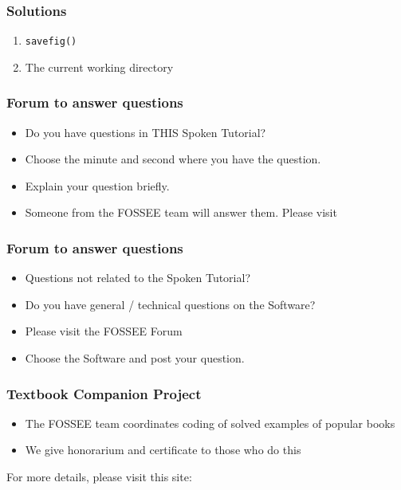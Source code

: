\documentclass[17pt]{beamer}
\begin{document}
\begin{frame}
\frametitle{Solutions}
\label{sec-11}
\begin{enumerate}
\item \texttt{savefig()}
\item The current working directory
\end{enumerate}
\end{frame}
\begin{frame}
\frametitle{Forum to answer questions}
\begin{itemize}
\item Do you have questions in THIS Spoken Tutorial?
\item Choose the minute and second where you have the question.
\item Explain your question briefly.
\item Someone from the FOSSEE team will answer them. Please visit 
\end{itemize}
\begin{center}
{\color{blue}{http://forums.spoken-tutorial.org/}}
 \end{center} 
\end{frame}
\begin{frame}
\frametitle{Forum to answer questions}
\begin{itemize}
\item Questions not related to the Spoken Tutorial?
\item Do you have general / technical questions on the Software?
\item Please visit the FOSSEE Forum
\begin{center}
{\color{blue}{http://forums.fossee.in/}}
 \end{center}
\item Choose the Software and post your question.
\end{itemize}
\end{frame}
\begin{frame}
\frametitle{Textbook Companion Project}
\begin{itemize}
\item The FOSSEE team coordinates coding of solved examples of popular
  books 
\item We give honorarium and certificate to those who do this
\end{itemize}
For more details, please visit this site:
\begin{center}
{\color{blue}{http://tbc-python.fossee.in/}}
\end{center}
\end{frame}
\end{document}
